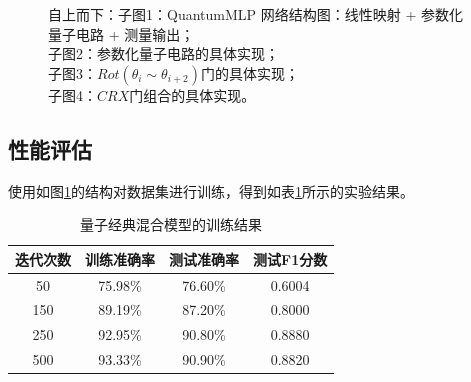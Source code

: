 \documentclass[10pt,a4paper,twoside]{article}
\numberwithin{figure}{section}%
\numberwithin{table}{section}%
\begin{document}
\begin{figure}[htb]
\caption{\centering 自上而下：子图1：QuantumMLP 网络结构图：线性映射 + 参数化量子电路 + 测量输出；\\ 子图2：参数化量子电路的具体实现；\\ 子图3：$Rot(\theta_{i}\sim\theta_{i+2})$门的具体实现；\\ 子图4：$CRX$门组合的具体实现。}
\label{fig:QuantumMLP}
\end{figure}



\subsection{性能评估}

使用如图\ref{fig:QuantumMLP}的结构对数据集进行训练，得到如表\ref{tab:Quantum Classic Model Training Results}所示的实验结果。

\begin{table}[H]
    \centering
    \caption{量子经典混合模型的训练结果}
    \label{tab:Quantum Classic Model Training Results}
    \begin{tabular}{cccc}
        \toprule
        \textbf{迭代次数} & \textbf{训练准确率} & \textbf{测试准确率} & \textbf{测试F1分数} \\
        \midrule
        50 & 75.98\% & 76.60\% & 0.6004 \\
        150 & 89.19\% & 87.20\% & 0.8000 \\
        250 & 92.95\% & 90.80\% & 0.8880 \\
        500 & 93.33\% & 90.90\% & 0.8820 \\
        \bottomrule
    \end{tabular}
\end{table}
\end{document}
